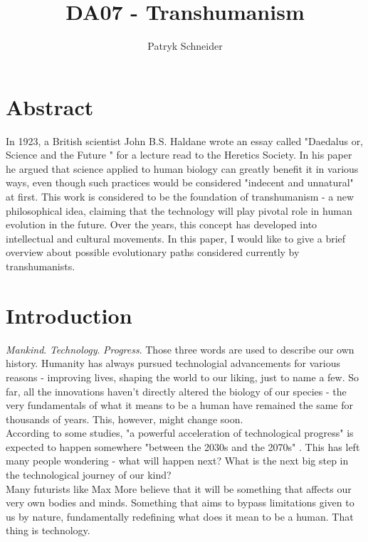 \documentclass[12pt]{article}
\begin{document}
\author{Patryk Schneider}
\title{DA07 - Transhumanism}
\maketitle

\section{Abstract}
	In 1923, a British scientist John B.S. Haldane wrote an essay called "Daedalus\; or, Science and the Future " for a lecture read to the Heretics Society. In his paper he argued that science applied to human biology can greatly benefit it in various ways, even though such practices would be considered "indecent and unnatural" \cite{haldane} at first. This work is considered to be the foundation of transhumanism - a new philosophical idea, claiming that the technology will play pivotal role in human evolution in the future. Over the years, this concept has developed into intellectual and cultural movements. In this paper, I would like to give a brief overview about possible evolutionary paths considered currently by transhumanists.

\newpage
\section{Introduction}
	\emph{Mankind}. \emph{Technology}. \emph{Progress}. Those three words are used to describe our own history. Humanity has always pursued technologial advancements for various reasons - improving lives, shaping the world to our liking, just to name a few. So far, all the innovations haven't directly altered the biology of our species - the very fundamentals of what it means to be a human have remained the same for thousands of years. This, however, might change soon. 
	\\According to some studies, "a powerful acceleration of technological progress" is expected to happen somewhere "between the 2030s and the 2070s" \cite{progressRate}. This has left many people wondering - what will happen next? What is the next big step in the technological journey of our kind?
	\\Many futurists like Max More believe that it will be something that affects our very own bodies and minds. Something that aims to bypass limitations given to us by nature, fundamentally redefining what does it mean to be a human. That thing is technology.
\end{document}
